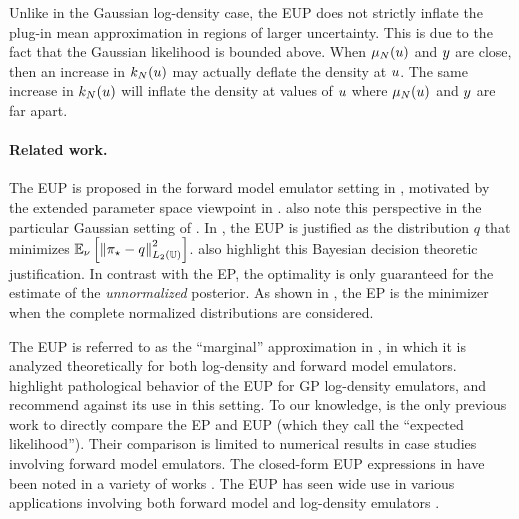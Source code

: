 \documentclass[12pt]{article}
\begin{document}
Unlike in the Gaussian log-density case, the EUP does not strictly inflate the plug-in 
mean approximation in regions of larger uncertainty. This is due to the fact that 
the Gaussian likelihood is bounded above. When $\mu_{N}(u)$ and $y$
are close, then an increase in $k_{N}(u)$ may actually deflate the density 
at $u$. The same increase in $k_{N}(u)$ will inflate the density at values 
of $u$ where $\mu_{N}(u)$ and $y$ are far apart.
 
\paragraph{Related work.} The EUP is proposed in the forward model emulator setting 
in \citet{BilionisBayesSurrogates}, motivated by the extended parameter space viewpoint
in . \citet{StuartTeck2,CES} also note this perspective
in the particular Gaussian setting of .
In \citet{SinsbeckNowak}, the EUP is justified as the distribution 
$q$ that minimizes $\mathbb{E}_{\nu}\left[\left\lVert{\pi}_{\star} - q\right\rVert_{L_2(\mathbb{U})}^2 \right]$.
\citet{StuartTeck1,StuartTeck2,VehtariParallelGP} also highlight this Bayesian 
decision theoretic justification. 
In contrast with the EP, the optimality is only guaranteed for the estimate of the 
\textit{unnormalized} posterior.
As shown in , the EP is the minimizer when the complete 
normalized distributions are considered.

The EUP is referred to as the ``marginal'' approximation in 
\citet{StuartTeck1,StuartTeck2,random_fwd_models,TeckHyperpar},
in which it is analyzed theoretically for both log-density and forward 
model emulators. \citet{VehtariParallelGP} highlight pathological 
behavior of the EUP for GP log-density emulators, and recommend 
against its use in this setting. To our knowledge, \citet{BurknerSurrogate}
is the only previous work to directly compare the EP and EUP (which 
they call the ``expected likelihood''). Their comparison is limited to 
numerical results in case studies involving forward model emulators.
The closed-form EUP expressions in 
 have been 
noted in a variety of works 
\citep{StuartTeck1,StuartTeck2,VehtariParallelGP,weightedIVAR,
GP_PDE_priors,Surer2023sequential,Takhtaganov2018AdaptiveBayesianGP}. 
The EUP has seen wide 
use in various applications involving both forward model 
and log-density emulators 
\citep{weightedIVAR,GP_PDE_priors,CES,idealizedGCM,
villani2024posteriorsamplingadaptivegaussian,hydrologicalModel,hydrologicalModel2}.
 
\end{document}
